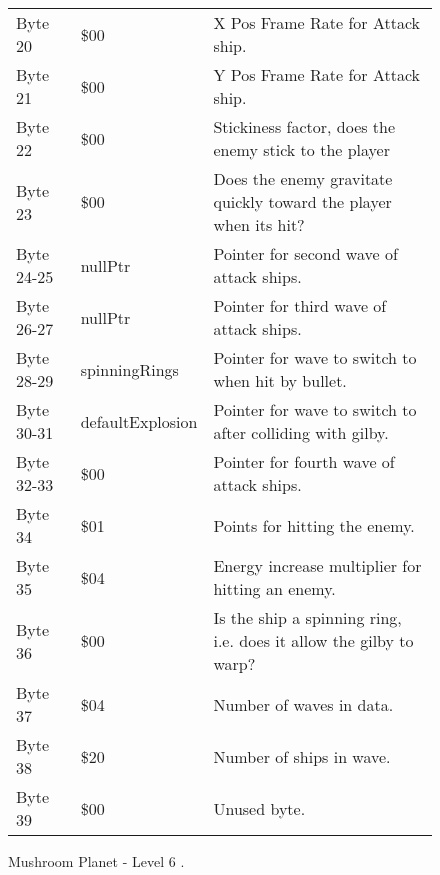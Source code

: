 \begin{figure}[H]
{\begin{adjustbox}{width=12cm}
\begin{tabular}{lll}
 Byte 20    & \$00                       & X Pos Frame Rate for Attack ship.                                   \\
 Byte 21    & \$00                       & Y Pos Frame Rate for Attack ship.                                   \\
 Byte 22    & \$00                       & Stickiness factor, does the enemy stick to the player               \\
 Byte 23    & \$00                       & Does the enemy gravitate quickly toward the player when its hit?    \\
 Byte 24-25 & nullPtr                   & Pointer for second wave of attack ships.                            \\
 Byte 26-27 & nullPtr                   & Pointer for third wave of attack ships.                             \\
 Byte 28-29 & spinningRings             & Pointer for wave to switch to when hit by bullet.                   \\
 Byte 30-31 & defaultExplosion          & Pointer for  wave to switch to after colliding with gilby.          \\
 Byte 32-33 & \$00                       & Pointer for fourth wave of attack ships.                            \\
 Byte 34    & \$01                       & Points for hitting the enemy.                                       \\
 Byte 35    & \$04                       & Energy increase multiplier for hitting an enemy.                    \\
 Byte 36    & \$00                       & Is the ship a spinning ring, i.e. does it allow the gilby to warp?  \\
 Byte 37    & \$04                       & Number of waves in data.                                            \\
 Byte 38    & \$20                       & Number of ships in wave.                                            \\
 Byte 39    & \$00                       & Unused byte.                                                        \\
\bottomrule
\end{tabular}

  \end{adjustbox}

  }\caption*{Mushroom Planet - Level 6
.}
\end{figure}


